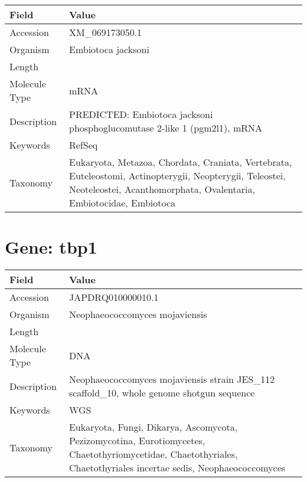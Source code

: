 \documentclass[10pt]{article}
\begin{document}
{\footnotesize
\begin{longtable}{>{\raggedright\arraybackslash}p{4.5cm} >{\raggedright\arraybackslash}p{11.5cm}}
\textbf{Field} & \textbf{Value} \\
\hline
Accession & XM\_069173050.1 \\
Organism & Embiotoca jacksoni \\
Length & 13393 \\
Molecule Type & mRNA \\
Description & PREDICTED: Embiotoca jacksoni phosphoglucomutase 2-like 1 (pgm2l1), mRNA \\
Keywords & RefSeq \\
Taxonomy & Eukaryota, Metazoa, Chordata, Craniata, Vertebrata, Euteleostomi, Actinopterygii, Neopterygii, Teleostei, Neoteleostei, Acanthomorphata, Ovalentaria, Embiotocidae, Embiotoca \\
\end{longtable}
}


\section*{Gene: tbp1}
{\footnotesize
\begin{longtable}{>{\raggedright\arraybackslash}p{4.5cm} >{\raggedright\arraybackslash}p{11.5cm}}
\textbf{Field} & \textbf{Value} \\
\hline
Accession & JAPDRQ010000010.1 \\
Organism & Neophaeococcomyces mojaviensis \\
Length & 260712 \\
Molecule Type & DNA \\
Description & Neophaeococcomyces mojaviensis strain JES\_112 scaffold\_10, whole genome shotgun sequence \\
Keywords & WGS \\
Taxonomy & Eukaryota, Fungi, Dikarya, Ascomycota, Pezizomycotina, Eurotiomycetes, Chaetothyriomycetidae, Chaetothyriales, Chaetothyriales incertae sedis, Neophaeococcomyces \\
\end{longtable}
}
\end{document}
